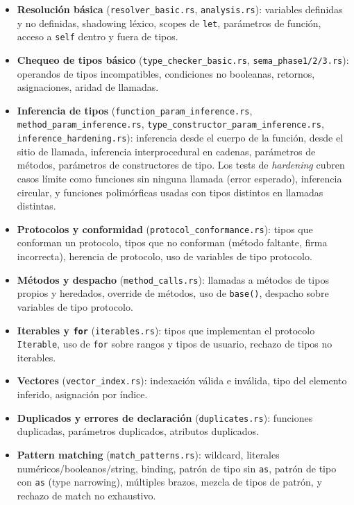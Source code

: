 \documentclass[12pt,letterpaper]{article}
\newcommand{\src}[1]{\texttt{#1}}
\begin{document}
\begin{itemize}
    \item \textbf{Resolución básica} (\src{resolver\_basic.rs}, \src{analysis.rs}): variables definidas y no definidas, shadowing léxico, scopes de \src{let}, parámetros de función, acceso a \src{self} dentro y fuera de tipos.
    \item \textbf{Chequeo de tipos básico} (\src{type\_checker\_basic.rs}, \src{sema\_phase1/2/3.rs}): operandos de tipos incompatibles, condiciones no booleanas, retornos, asignaciones, aridad de llamadas.
    \item \textbf{Inferencia de tipos} (\src{function\_param\_inference.rs}, \src{method\_param\_inference.rs}, \src{type\_constructor\_param\_inference.rs}, \src{inference\_hardening.rs}): inferencia desde el cuerpo de la función, desde el sitio de llamada, inferencia interprocedural en cadenas, parámetros de métodos, parámetros de constructores de tipo. Los tests de \textit{hardening} cubren casos límite como funciones sin ninguna llamada (error esperado), inferencia circular, y funciones polimórficas usadas con tipos distintos en llamadas distintas.
    \item \textbf{Protocolos y conformidad} (\src{protocol\_conformance.rs}): tipos que conforman un protocolo, tipos que no conforman (método faltante, firma incorrecta), herencia de protocolo, uso de variables de tipo protocolo.
    \item \textbf{Métodos y despacho} (\src{method\_calls.rs}): llamadas a métodos de tipos propios y heredados, override de métodos, uso de \src{base()}, despacho sobre variables de tipo protocolo.
    \item \textbf{Iterables y \src{for}} (\src{iterables.rs}): tipos que implementan el protocolo \src{Iterable}, uso de \src{for} sobre rangos y tipos de usuario, rechazo de tipos no iterables.
    \item \textbf{Vectores} (\src{vector\_index.rs}): indexación válida e inválida, tipo del elemento inferido, asignación por índice.
    \item \textbf{Duplicados y errores de declaración} (\src{duplicates.rs}): funciones duplicadas, parámetros duplicados, atributos duplicados.
    \item \textbf{Pattern matching} (\src{match\_patterns.rs}): wildcard, literales numéricos/booleanos/string, binding, patrón de tipo sin \src{as}, patrón de tipo con \src{as} (type narrowing), múltiples brazos, mezcla de tipos de patrón, y rechazo de match no exhaustivo.
\end{itemize}
\end{document}
